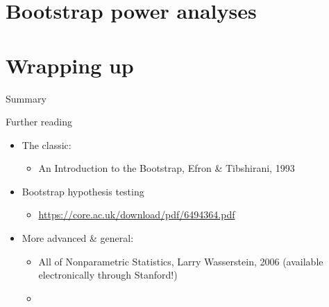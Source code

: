 \documentclass{beamer} %
\begin{document}
\section{Bootstrap power analyses}


\section{Wrapping up}

\begin{frame}{Summary}

\end{frame}

\begin{frame}{Further reading}
\begin{itemize}
\item The classic:
    \begin{itemize}
    \item An Introduction to the Bootstrap, Efron \& Tibshirani, 1993
    \end{itemize}
\item Bootstrap hypothesis testing 
    \begin{itemize}
    \item \url{https://core.ac.uk/download/pdf/6494364.pdf} 
    \end{itemize}
\item More advanced \& general: 
    \begin{itemize}
    \item All of Nonparametric Statistics, Larry Wasserstein, 2006 (available electronically through Stanford!)
    \item 
    \end{itemize}
\end{itemize}
\end{frame}
\end{document}
